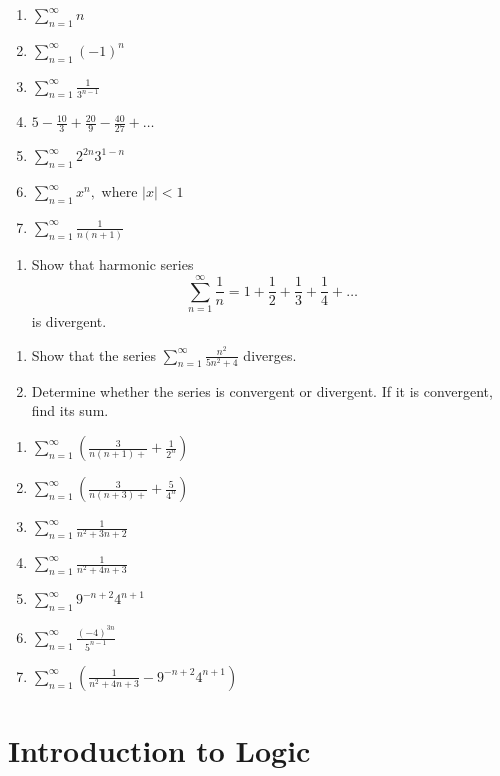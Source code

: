 \documentclass[]{book}
\providecommand{\tightlist}{%
  \setlength{\itemsep}{0pt}\setlength{\parskip}{0pt}}
\begin{document}
\begin{enumerate}
\def\labelenumi{\alph{enumi})}
\tightlist
\item
  \(\sum_{n=1}^\infty n\) 
\item
  \(\sum_{n=1}^\infty (-1)^n\) 
\item
  \(\sum_{n=1}^\infty \frac{1}{3^{n-1}}\) 
\item
  \(5-\frac{10}{3}+\frac{20}{9}- \frac{40}{27}+\dots\) 
\item
  \(\sum_{n=1}^\infty 2^{2n}3^{1-n}\) 
\item
  \(\sum_{n=1}^\infty x^n,\) where \(|x| <1\) 
\item
  \(\sum_{n=1}^\infty\frac{1}{n(n+1)}\) 
\end{enumerate}

\begin{enumerate}
\def\labelenumi{\arabic{enumi}.}
\setcounter{enumi}{9}
\tightlist
\item
  Show that harmonic series
  \[\sum_{n=1}^\infty \frac{1}{n} = 1+\frac{1}{2}+ \frac{1}{3} + \frac{1}{4}+\dots\] is divergent.
\end{enumerate}

\begin{enumerate}
\def\labelenumi{\arabic{enumi}.}
\setcounter{enumi}{10}
\item
  Show that the series \(\sum_{n=1}^\infty\frac{n^2}{5n^2+4}\) diverges.
\item
  Determine whether the series is convergent or divergent. If it is convergent, find its sum.
\end{enumerate}

\begin{enumerate}
\def\labelenumi{\alph{enumi})}
\tightlist
\item
  \(\sum_{n=1}^\infty\left(\frac{3}{n(n+1)+ }+\frac{1}{2^n}\right)\) 
\item
  \(\sum_{n=1}^\infty\left(\frac{3}{n(n+3)+ }+\frac{5}{4^n}\right)\) 
\item
  \(\sum_{n=1}^\infty \frac{1}{n^2+3n+2}\) 
\item
  \(\sum_{n=1}^\infty \frac{1}{n^2+4n+3}\) 
\item
  \(\sum_{n=1}^\infty 9^{-n+2}4^{n+1}\) 
\item
  \(\sum_{n=1}^\infty \frac{(-4)^{3n}}{5^{n-1}}\) 
\item
  \(\sum_{n=1}^\infty \left(\frac{1}{n^2+4n+3}- 9^{-n+2}4^{n+1}\right)\) 
\end{enumerate}

\hypertarget{introduction-to-logic}{%
\chapter{Introduction to Logic}\label{introduction-to-logic}}
\end{document}
